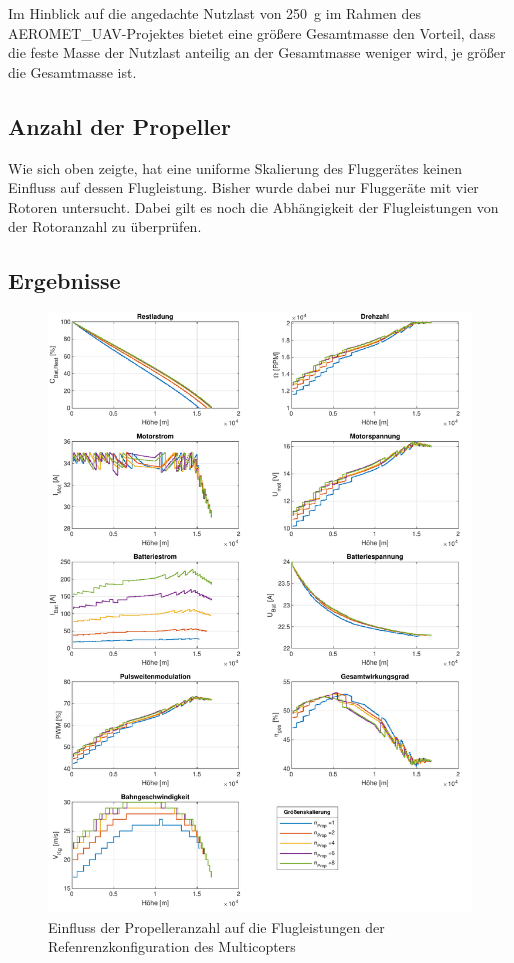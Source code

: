 Im Hinblick auf die angedachte Nutzlast von \SI{250}{g} im Rahmen des AEROMET\_UAV-Projektes bietet eine größere Gesamtmasse den Vorteil, dass die feste Masse der Nutzlast anteilig an der Gesamtmasse weniger wird, je größer die Gesamtmasse ist.


\subsection{Anzahl der Propeller}
Wie sich oben zeigte, hat eine uniforme Skalierung des Fluggerätes keinen Einfluss auf dessen Flugleistung. Bisher wurde dabei nur Fluggeräte mit vier Rotoren untersucht. Dabei gilt es noch die Abhängigkeit der Flugleistungen von der Rotoranzahl zu überprüfen. 

\subsection{Ergebnisse}
\begin{figure}[H]
	\includegraphics[scale=0.7]{Diagramme/Anz_Prop.pdf}
	\caption{Einfluss der Propelleranzahl auf die Flugleistungen der Refenrenzkonfiguration des Multicopters}
	\label{abb:groessenskalierung}
\end{figure}
